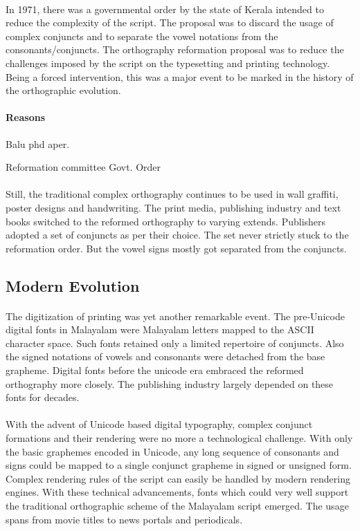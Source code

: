 \documentclass[10pt]{article}
\begin{document}
\paragraph{}
In 1971, there was a governmental order by the state of Kerala intended to reduce the complexity of the script. The proposal was to discard the usage of complex conjuncts and to separate the vowel notations from the consonants/conjuncts.  The orthography  reformation proposal was to reduce the challenges imposed by the script on the typesetting and printing technology. Being a forced intervention, this was a major event to be marked in the history of the orthographic evolution. 

\paragraph{Reasons}

Balu phd aper.

Reformation committee
Govt. Order

\paragraph{}
Still, the traditional complex orthography continues to be used in wall graffiti, poster designs and handwriting. The print media, publishing industry  and text books switched to the reformed orthography to varying extends. Publishers adopted a set of conjuncts as per their choice. The set never strictly stuck to the reformation order. But the vowel signs mostly got separated from the conjuncts. 

\subsection{Modern Evolution}
\paragraph{}
The digitization of printing was yet another remarkable event. The pre-Unicode digital fonts in Malayalam were Malayalam letters mapped to the ASCII character space.  Such fonts retained only a limited repertoire of conjuncts. Also the signed notations of vowels and consonants were detached from the base grapheme. Digital fonts before the unicode era embraced the reformed orthography more closely. The publishing industry largely depended on these fonts for decades.


\paragraph{}
With the advent of Unicode based digital typography, complex conjunct formations and their rendering were no more a technological challenge. With only the basic graphemes  encoded in Unicode, any long sequence of consonants and signs could be mapped to a single conjunct grapheme in signed or unsigned form.  Complex rendering rules of the script can easily be handled by modern rendering engines. With these technical advancements, fonts which could very well support the traditional orthographic scheme of the Malayalam script emerged. The usage spans from movie titles to news portals and periodicals.
\end{document}

